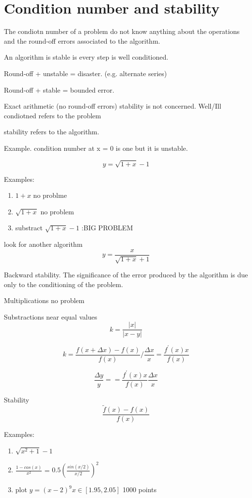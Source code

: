 

\section{Condition number and stability} 
    
The condiotn number of a problem do not know anything about the operations 
and the round-off errors associated to the algorithm.  

An algorithm is stable is every step is well conditioned. 

Round-off + unstable = disaster. (e.g. alternate series)

Round-off + stable = bounded error. 

Exact arithmetic (no round-off errors) stability is not concerned. 
Well/Ill condiotned refers to the problem 

stability refers to the algorithm. 

Example. condition number at x = 0 is one but it is unstable. 

 
$$
y = \sqrt{1+x} - 1 
$$   


Examples: 
\begin{enumerate} 
\item $1+ x $ no problme
\item $ \sqrt{1+x} $ no problem 
\item substract  $ \sqrt{1+x} - 1 $ :BIG PROBLEM 

\end{enumerate}
look for another algorithm 
$$
y =  \frac{x}{\sqrt{1+x} + 1}
$$

Backward stability. The significance of the error produced by the algorithm is due only to
the conditioning of the problem. 


Multiplications no problem 

Substractions near equal values 
$$ 
k = \frac{ | x | }{ |x - y |}
$$   
    
    $$
     k = \frac{ f(x+\Delta x) - f(x) }{ f(x)} / \frac{ \Delta x  }{ x} = \frac{ f^\prime(x) x }{ f(x)}  
    $$
    
    $$
        \frac{\Delta y}{ y }  =  = \frac{ f^\prime(x) x }{ f(x)}  \frac{\Delta x}{ x}
    $$
    
    
    Stability 
    $$
      \frac{\tilde{f} (x) - f(x)   }{ f(x) }
    $$

Examples: 
\begin{enumerate} 
\item $\sqrt{x^2+1} -1$ 
\item $ \frac{1- cos(x)}{ x^2} $ = $ 0.5 ( \frac{ sin(x/2)}   {x/2 } )^2 $
\item plot $ y = (x-2)^9 x \in [ 1.95, 2.05] $ 1000 points 


\end{enumerate}




